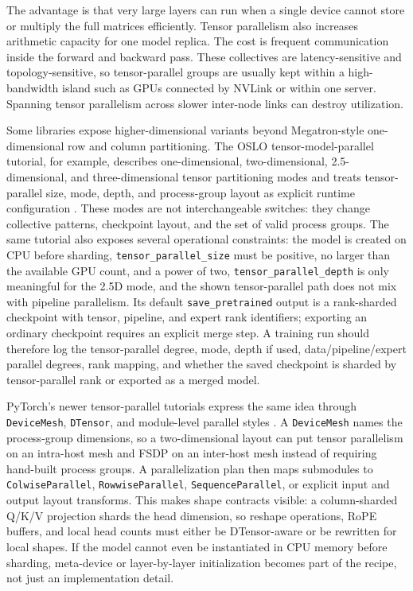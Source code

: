 The advantage is that very large layers can run when a single device cannot store or multiply the full matrices efficiently. Tensor parallelism also increases arithmetic capacity for one model replica. The cost is frequent communication inside the forward and backward pass. These collectives are latency-sensitive and topology-sensitive, so tensor-parallel groups are usually kept within a high-bandwidth island such as GPUs connected by NVLink or within one server. Spanning tensor parallelism across slower inter-node links can destroy utilization.

Some libraries expose higher-dimensional variants beyond Megatron-style one-dimensional row and column partitioning. The OSLO tensor-model-parallel tutorial, for example, describes one-dimensional, two-dimensional, 2.5-dimensional, and three-dimensional tensor partitioning modes and treats tensor-parallel size, mode, depth, and process-group layout as explicit runtime configuration \cite{oslo2025tensorparallel}. These modes are not interchangeable switches: they change collective patterns, checkpoint layout, and the set of valid process groups. The same tutorial also exposes several operational constraints: the model is created on CPU before sharding, \texttt{tensor\_parallel\_size} must be positive, no larger than the available GPU count, and a power of two, \texttt{tensor\_parallel\_depth} is only meaningful for the 2.5D mode, and the shown tensor-parallel path does not mix with pipeline parallelism. Its default \texttt{save\_pretrained} output is a rank-sharded checkpoint with tensor, pipeline, and expert rank identifiers; exporting an ordinary checkpoint requires an explicit merge step. A training run should therefore log the tensor-parallel degree, mode, depth if used, data/pipeline/expert parallel degrees, rank mapping, and whether the saved checkpoint is sharded by tensor-parallel rank or exported as a merged model.

PyTorch's newer tensor-parallel tutorials express the same idea through \texttt{DeviceMesh}, \texttt{DTensor}, and module-level parallel styles \cite{pytorch2025tptutorial,pytorch2025devicemesh}. A \texttt{DeviceMesh} names the process-group dimensions, so a two-dimensional layout can put tensor parallelism on an intra-host mesh and FSDP on an inter-host mesh instead of requiring hand-built process groups. A parallelization plan then maps submodules to \texttt{ColwiseParallel}, \texttt{RowwiseParallel}, \texttt{SequenceParallel}, or explicit input and output layout transforms. This makes shape contracts visible: a column-sharded Q/K/V projection shards the head dimension, so reshape operations, RoPE buffers, and local head counts must either be DTensor-aware or be rewritten for local shapes. If the model cannot even be instantiated in CPU memory before sharding, meta-device or layer-by-layer initialization becomes part of the recipe, not just an implementation detail.

